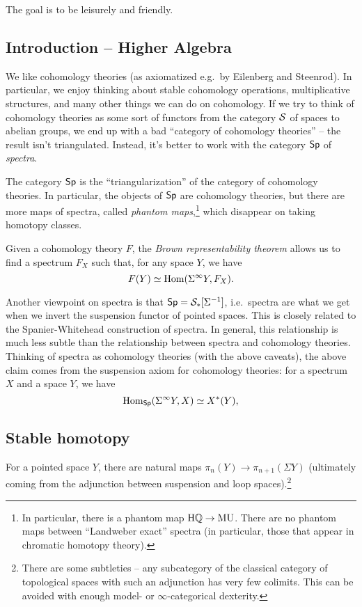 \documentclass{article}
\begin{document}
The goal is to be leisurely and friendly.

\subsection{Introduction -- Higher Algebra}

We like cohomology theories (as axiomatized e.g.\ by Eilenberg and Steenrod).
In particular, we enjoy thinking about stable cohomology operations, multiplicative structures, and many other things we can do on cohomology.
If we try to think of cohomology theories as some sort of functors from the category $\mathcal{S}$ of spaces to abelian groups, we end up with a bad ``category of cohomology theories'' -- the result isn't triangulated.
Instead, it's better to work with the category $\mathsf{Sp}$ of \emph{spectra}.

\begin{thm}
	The category $\mathsf{Sp}$ is the ``triangularization'' of the category of cohomology theories.
	In particular, the objects of $\mathsf{Sp}$ are cohomology theories, but there are more maps of spectra, called \emph{phantom maps},\footnote{In particular, there is a phantom map $\mathrm{H}\mathbb{Q} \to \mathrm{MU}$.
	There are no phantom maps between ``Landweber exact'' spectra (in particular, those that appear in chromatic homotopy theory).} which disappear on taking homotopy classes.
\end{thm}

Given a cohomology theory $F$, the \emph{Brown representability theorem} allows us to find a spectrum $F_X$ such that, for any space $Y$, we have
\[
	F(Y) \simeq \operatorname{Hom}(\Sigma^\infty Y, F_X).
\]

Another viewpoint on spectra is that $\mathsf{Sp} = \mathcal{S}_*[\Sigma^{-1}]$, i.e.\ spectra are what we get when we invert the suspension functor of pointed spaces.
This is closely related to the Spanier-Whitehead construction of spectra.
In general, this relationship is much less subtle than the relationship between spectra and cohomology theories.
Thinking of spectra as cohomology theories (with the above caveats), the above claim comes from the suspension axiom for cohomology theories: for a spectrum $X$ and a space $Y$, we have
\[
	\operatorname{Hom}_{\mathsf{Sp}}(\Sigma^\infty Y, X) \simeq X^*(Y),
\]

\subsection{Stable homotopy}

For a pointed space $Y$, there are natural maps $\pi_n(Y) \to \pi_{n+1}(\Sigma Y)$ (ultimately coming from the adjunction between suspension and loop spaces).\footnote{There are some subtleties -- any subcategory of the classical category of topological spaces with such an adjunction has very few colimits.
This can be avoided with enough model- or $\infty$-categorical dexterity.}
\end{document}
